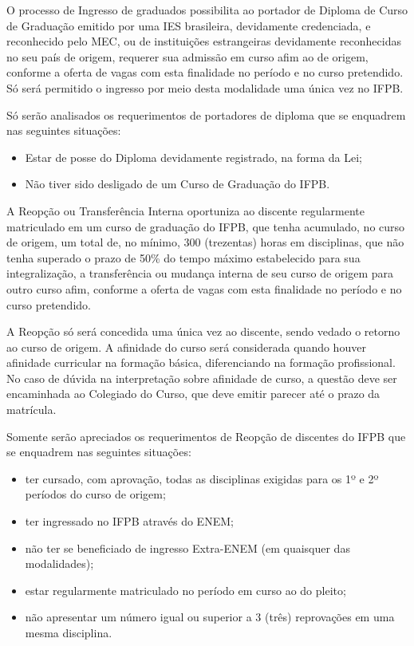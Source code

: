 		O processo de Ingresso de graduados possibilita ao portador de Diploma de Curso de Graduação emitido por uma IES brasileira, devidamente credenciada, e reconhecido pelo MEC, ou de instituições estrangeiras devidamente reconhecidas no seu país de origem, requerer sua admissão em curso afim ao de origem, conforme a oferta de vagas com esta finalidade no período e no curso pretendido. Só será permitido o ingresso por meio desta modalidade uma única vez no IFPB. 
		
		Só serão analisados os requerimentos de portadores de diploma que se enquadrem nas seguintes situações:
		\begin{itemize}
			\item Estar de posse do Diploma devidamente registrado, na forma da Lei;
			\item Não tiver sido desligado de um Curso de Graduação do IFPB.
		\end{itemize}

	A Reopção ou Transferência Interna oportuniza ao discente regularmente matriculado em um curso de graduação do IFPB, que tenha acumulado, no curso de origem, um total de, no mínimo, 300 (trezentas) horas em disciplinas, que não tenha superado o prazo de 50\% do tempo máximo estabelecido para sua integralização, a transferência ou mudança interna de seu curso de origem para outro curso afim, conforme a oferta de vagas com esta finalidade no período e no curso pretendido.

	A Reopção só será concedida uma única vez ao discente, sendo vedado o retorno ao curso de origem. A afinidade do curso será considerada quando houver afinidade curricular na formação básica, diferenciando na formação profissional. No caso de dúvida na interpretação sobre afinidade de curso, a questão deve ser encaminhada ao Colegiado do Curso, que deve emitir parecer até o prazo da matrícula.

	Somente serão apreciados os requerimentos de Reopção de discentes do IFPB que se enquadrem nas seguintes situações:
	\begin{itemize}
		\item ter cursado, com aprovação, todas as disciplinas exigidas para os 1º e 2º períodos do curso de origem;

		\item ter ingressado no IFPB através do ENEM;

		\item não ter se beneficiado de ingresso Extra-ENEM (em quaisquer das modalidades);
		
		\item estar regularmente matriculado no período em curso ao do pleito;
		
		\item não apresentar um número igual ou superior a 3 (três) reprovações em uma mesma disciplina.
	\end{itemize}

